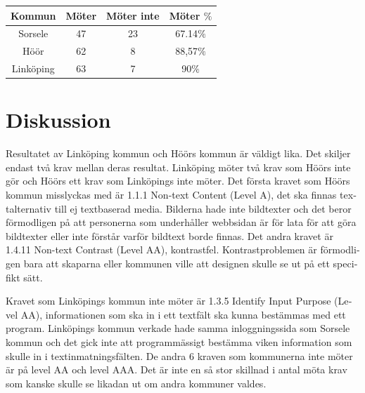\documentclass[11p]{article}
\begin{document}
\begin{otherlanguage}{swedish}
\begin{center}
    \begin{tabular}{ |c|c|c|c|}
        \hline
        Kommun & Möter & Möter inte & Möter $\%$ \\  \hline
        Sorsele & 47 & 23 & 67.14$\%$ \\ \hline
        Höör & 62 & 8 & 88,57$\%$ \\ \hline
        Linköping & 63 & 7 & 90$\%$ \\ \hline
    \end{tabular}
    \end{center}

    \section{Diskussion} %
    Resultatet av Linköping kommun och Höörs kommun är väldigt lika.
    Det skiljer endast två krav mellan deras resultat.
    Linköping möter två krav som Höörs inte gör och Höörs ett krav som Linköpings inte möter.
    Det första kravet som  Höörs kommun misslyckas med är 1.1.1 Non-text Content (Level A), det ska finnas textalternativ till ej textbaserad media.
    Bilderna hade inte bildtexter och det beror förmodligen på att personerna som underhåller webbsidan är för lata för att göra bildtexter eller inte förstår varför bildtext borde finnas.
    Det andra kravet är 1.4.11 Non-text Contrast (Level AA), kontrastfel.
    Kontrastproblemen är förmodligen bara att skaparna eller kommunen ville att designen skulle se ut på ett specifikt sätt.

    Kravet som Linköpings kommun inte möter är 1.3.5 Identify Input Purpose (Level AA), informationen som ska in i ett textfält ska kunna bestämmas med ett program.
    Linköpings kommun verkade hade samma inloggningssida som Sorsele kommun och det gick inte att programmässigt bestämma viken information som skulle in i textinmatningsfälten.
    De andra 6 kraven som kommunerna inte möter är på level AA och level AAA.
    Det är inte en så stor skillnad i antal möta krav som kanske skulle se likadan ut om andra kommuner valdes.


\end{otherlanguage}
\end{document}
